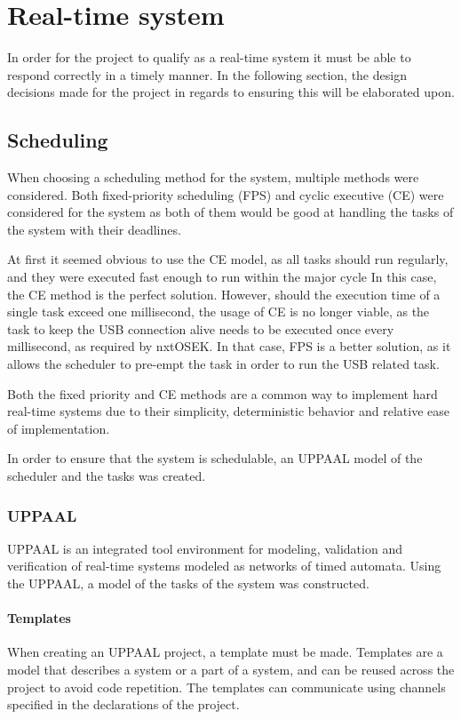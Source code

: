 \section{Real-time system}\label{Design:RTS}
In order for the project to qualify as a real-time system it must be able to respond correctly in a timely manner.
In the following section, the design decisions made for the project in regards to ensuring this will be elaborated upon.

\subsection{Scheduling}\label{Design:Scheduling}
When choosing a scheduling method for the system, multiple methods were considered.
Both fixed-priority scheduling (FPS) and cyclic executive (CE) were considered for the system as both of them would be good at handling the tasks of the system with their deadlines.

At first it seemed obvious to use the CE model, as all tasks should run regularly, and they were executed fast enough to run within the major cycle
In this case, the CE method is the perfect solution.
However, should the execution time of a single task exceed one millisecond, the usage of CE is no longer viable, as the task to keep the USB connection alive needs to be executed once every millisecond, as required by nxtOSEK.
In that case, FPS is a better solution, as it allows the scheduler to pre-empt the task in order to run the USB related task.

Both the fixed priority and CE methods are a common way to implement hard real-time systems due to their simplicity, deterministic behavior and relative ease of implementation\cite{CyclicExecutionKimLarsen}.

In order to ensure that the system is schedulable, an UPPAAL model of the scheduler and the tasks was created.

\subsubsection{UPPAAL}
UPPAAL is an integrated tool environment for modeling, validation and verification of real-time systems modeled as networks of timed automata\cite{UPPAALWebsite}.
Using the UPPAAL, a model of the tasks of the system was constructed.

\paragraph{Templates}
When creating an UPPAAL project, a template must be made.
Templates are a model that describes a system or a part of a system, and can be reused across the project to avoid code repetition.
The templates can communicate using channels specified in the declarations of the project.

